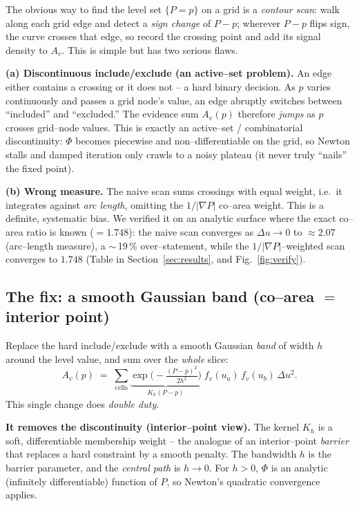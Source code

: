 \documentclass[11pt]{article}
\newcommand{\grad}{\nabla}
\begin{document}
The obvious way to find the level set $\{P=p\}$ on a grid is a
\emph{contour scan}: walk along each grid edge and detect a
\emph{sign change} of $P-p$; wherever $P-p$ flips sign, the curve crosses
that edge, so record the crossing point and add its signal density to $A_v$.
This is simple but has two serious flaws.

\textbf{(a) Discontinuous include/exclude (an active--set problem).}
An edge either contains a crossing or it does not -- a hard binary decision.
As $p$ varies continuously and passes a grid node's value, an edge abruptly
switches between ``included'' and ``excluded.'' The evidence sum $A_v(p)$
therefore \emph{jumps} as $p$ crosses grid--node values. This is exactly an
active--set / combinatorial discontinuity: $\Phi$ becomes piecewise and
non--differentiable on the grid, so Newton stalls and damped iteration only
crawls to a noisy plateau (it never truly ``nails'' the fixed point).

\textbf{(b) Wrong measure.} The naive scan sums crossings with equal weight,
i.e.\ it integrates against \emph{arc length}, omitting the $1/|\grad P|$
co--area weight. This is a definite, systematic bias. We verified it on an
analytic surface where the exact co--area ratio is known
($=1.748$): the naive scan converges as $\Delta u\to0$ to $\approx 2.07$
(arc--length measure), a $\sim$\,19\,\% over--statement, while the
$1/|\grad P|$--weighted scan converges to $1.748$ (Table in
Section~\ref{sec:results}, and Fig.~\ref{fig:verify}).

\subsection{The fix: a smooth Gaussian band (co--area $=$ interior point)}

Replace the hard include/exclude with a smooth Gaussian \emph{band} of
width $h$ around the level value, and sum over the \emph{whole} slice:
\begin{equation}
  A_v(p) \;=\; \sum_{\text{cells}}
  \underbrace{\exp\!\Big(-\tfrac{(P-p)^2}{2h^2}\Big)}_{K_h(P-p)}\;
  f_v(u_a)\,f_v(u_b)\,\Delta u^2 .
  \label{eq:band}
\end{equation}
This single change does \emph{double duty}.

\textbf{It removes the discontinuity (interior--point view).} The kernel
$K_h$ is a soft, differentiable membership weight -- the analogue of an
interior--point \emph{barrier} that replaces a hard constraint by a smooth
penalty. The bandwidth $h$ is the barrier parameter, and the
\emph{central path} is $h\to0$. For $h>0$, $\Phi$ is an analytic
(infinitely differentiable) function of $P$, so Newton's quadratic
convergence applies.
\end{document}

